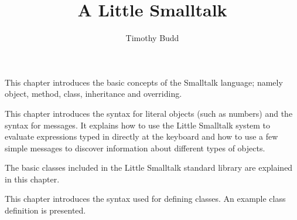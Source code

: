 

\title{A Little Smalltalk}
\author{Timothy Budd}



\maketitle
\tableofcontents


\secdown

\secdown

This chapter introduces the basic concepts of the Smalltalk language;
namely object, method, class, inheritance and overriding.

\secup

\secdown

This chapter introduces the syntax for literal objects (such as numbers)
and the syntax for messages. It explains how to use the Little Smalltalk
system to evaluate expressions typed in directly at the keyboard and
how to use a few simple messages to discover information about different types of objects.


\secup

\secdown

The basic classes included in the Little Smalltalk standard library are
explained in this chapter.


\secup

\secdown

This chapter introduces the syntax used for defining classes. An example class definition is presented.


\secup

\secdown

